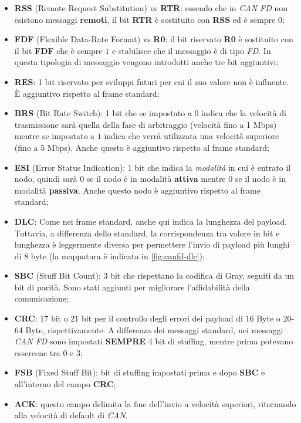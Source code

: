 \begin{itemize}
    \item \textbf{RSS} (Remote Request Substitution) vs \textbf{RTR}: essendo che in \emph{CAN FD} non esistono messaggi \textbf{remoti}, il bit \textbf{RTR} è sostituito con \textbf{RSS} ed è sempre $0$; 
    \item \textbf{FDF} (Flexible Data-Rate Format) vs \textbf{R0}: il bit riservato \textbf{R0} è sostituito con il bit \textbf{FDF} che è sempre $1$ e stabilisce che il messaggio è di tipo \emph{FD}. In questa tipologia di messaggio vengono introdotti anche tre bit aggiuntivi;
    \item \textbf{RES}: 1 bit riservato per sviluppi futuri per cui il suo valore non è influente. È aggiuntivo rispetto al frame standard;
    \item \textbf{BRS} (Bit Rate Switch): 1 bit che se impostato a $0$ indica che la velocità di trasmissione sarà quella della fase di arbitraggio (velocità fino a 1 Mbps) mentre se impostato a $1$ indica che verrà utilizzata una velocità superiore (fino a 5 Mbps). Anche questo è aggiuntivo rispetto al frame standard;
    \item \textbf{ESI} (Error Status Indication): 1 bit che indica la \emph{modalità} in cui è entrato il nodo, quindi sarà $0$ se il nodo è in modalità \textbf{attiva} mentre $0$ se il nodo è in modalità \textbf{passiva}. Anche questo nodo è aggiuntivo rispetto al frame standard;
    \item \textbf{DLC}: Come nei frame standard, anche qui indica la lunghezza del payload. Tuttavia, a differenza dello standard, la corrispondenza tra valore in bit e lunghezza è leggermente diversa per permettere l'invio di payload più lunghi di 8 byte (la mappatura è indicata in \autoref{fig:canfd-dlc});
    \item \textbf{SBC} (Stuff Bit Count): 3 bit che rispettano la codifica di Gray, seguiti da un bit di parità. Sono stati aggiunti per migliorare l'affidabilità della comunicazione;
    \item \textbf{CRC}: 17 bit o 21 bit per il controllo degli errori dei payload di 16 Byte o 20-64 Byte, rispettivamente. A differenza dei messaggi standard, nei messaggi \emph{CAN FD} sono impostati \textbf{SEMPRE} 4 bit di stuffing, mentre prima potevano essercene tra 0 e 3;
    \item \textbf{FSB} (Fixed Stuff Bit): bit di stuffing impostati prima e dopo \textbf{SBC} e all'interno del campo \textbf{CRC};
    \item \textbf{ACK}: questo campo delimita la fine dell'invio a velocità superiori, ritornando alla velocità di default di \emph{CAN}.
\end{itemize}

